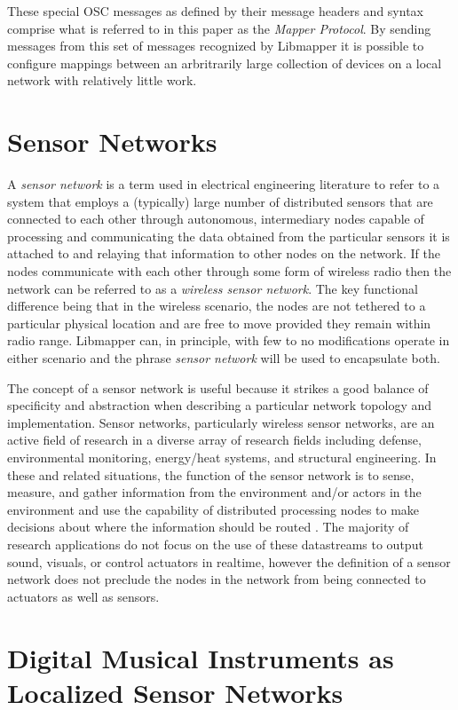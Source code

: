 These special OSC messages as defined by their message headers and syntax comprise what is referred to in this paper as the \emph{Mapper Protocol}. By sending messages from this set of messages recognized by Libmapper it is possible to configure mappings between an arbritrarily large collection of devices on a local network with relatively little work.

\section{Sensor Networks}

A \emph{sensor network} is a term used in electrical engineering literature to refer to a system that employs a (typically) large number of distributed sensors that are connected to each other through autonomous, intermediary nodes capable of processing and communicating the data obtained from the particular sensors it is attached to and relaying that information to other nodes on the network. If the nodes communicate with each other through some form of wireless radio then the network can be referred to as a \emph{wireless sensor network}. The key functional difference being that in the wireless scenario, the nodes are not tethered to a particular physical location and are free to move provided they remain within radio range. Libmapper can, in principle, with few to no modifications operate in either scenario and the phrase \emph{sensor network} will be used to encapsulate both.

The concept of a sensor network is useful because it strikes a good balance of specificity and abstraction when describing a particular network topology and implementation. Sensor networks, particularly wireless sensor networks, are an active field of research in a diverse array of research fields including defense, environmental monitoring, energy/heat systems, and structural engineering. In these and related situations, the function of the sensor network is to sense, measure, and gather information from the environment and/or actors in the environment and use the capability of distributed processing nodes to make decisions about where the information should be routed \cite{survey2008}. The majority of research applications do not focus on the use of these datastreams to output sound, visuals, or control actuators in realtime, however the definition of a sensor network does not preclude the nodes in the network from being connected to actuators as well as sensors.

\section{Digital Musical Instruments as Localized Sensor Networks}

